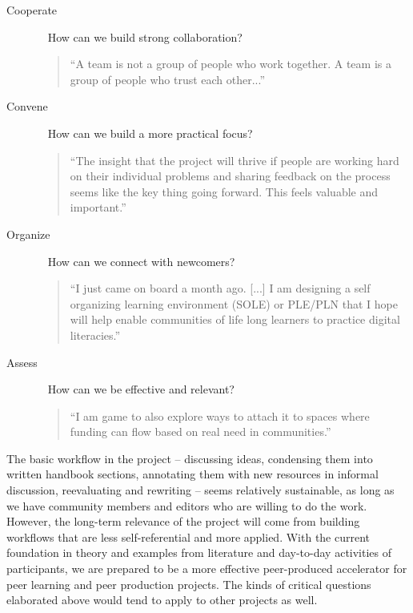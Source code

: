 \documentclass{acm_proc_article-sp}
\begin{document}
\begin{description}
\item[Cooperate] ~ How can we build strong collaboration?
\begin{quote}``A team is not a group of people who work together. A team is a group of people who trust each other...''
\end{quote}
\item[Convene] ~ How can we build a more practical focus?
\begin{quote}``The insight that the project will thrive if people are working hard on their individual problems and sharing feedback on the process seems like the key thing going forward. This feels valuable and important.''\end{quote}
\item[Organize] ~ How can we connect with newcomers?
\begin{quote}``I just came on board a month ago. [...] I am designing a self organizing learning environment (SOLE) or PLE/PLN that I hope will help enable communities of life long learners to practice digital literacies.''
\end{quote}
\item[Assess] ~ How can we be effective and relevant?
\begin{quote}``I am game to also explore ways to attach it to spaces where funding can flow based on real need in communities.''
\end{quote}
\end{description}

The basic workflow in the project -- discussing ideas, condensing them into written handbook sections, annotating them with new resources in informal discussion, reevaluating and rewriting -- seems relatively sustainable, as long as we have community members and editors who are willing to do the work. However, the long-term relevance of the project will come from building workflows that are less self-referential and more applied. With the current foundation in theory and examples from literature and day-to-day activities of participants, we are prepared to be a more effective peer-produced accelerator for peer learning and peer production projects. The kinds of critical questions elaborated above would tend to apply to other projects as well.
\end{document}

